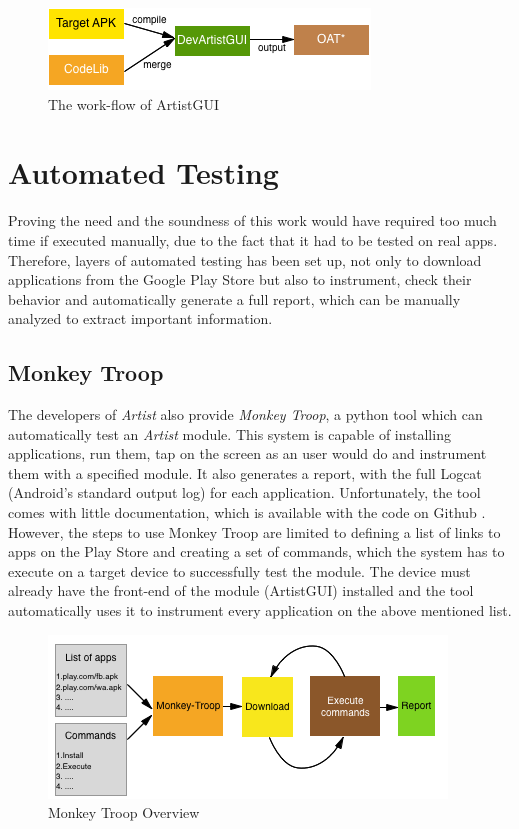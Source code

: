 \begin{figure}[H]
	\centering
	\includegraphics{img/devartistgui.png}
	\caption{The work-flow of ArtistGUI}
	\label{fig:installprocess}
\end{figure}

\section{Automated Testing}
Proving the need and the soundness of this work would have required too much time if executed manually, due to the fact that it had to be tested on real apps. Therefore, layers of automated testing has been set up, not only to download applications from the Google Play Store but also to instrument, check their behavior and automatically generate a full report, which can be manually analyzed to extract important information.

\subsection{Monkey Troop}
The developers of \emph{Artist} also provide \emph{Monkey Troop}, a python tool which can automatically test an \emph{Artist} module. This system is capable of installing applications, run them, tap on the screen as an user would do and instrument them with a specified module. It also generates a report, with the full Logcat (Android's standard output log) for each application. Unfortunately, the tool comes with little documentation, which is available with the code on Github \cite{monkeytroop}. However, the steps to use Monkey Troop are limited to defining a list of links to apps on the Play Store and creating a set of commands, which the system has to execute on a target device to successfully test the module. The device must already have the front-end of the module (ArtistGUI) installed and the tool automatically uses it to instrument every application on the above mentioned list.

\begin{figure}[H]
	\centering
	\includegraphics{img/monkey_troop.png}
	\caption{Monkey Troop Overview}
	\label{fig:monkeyoverview}
\end{figure}

